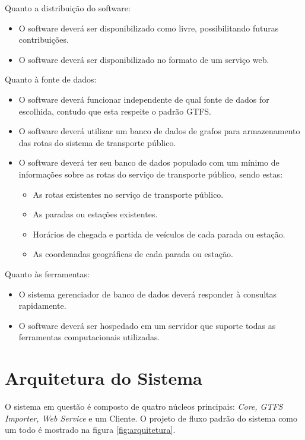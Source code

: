 Quanto a distribuição do software:
\begin{itemize}
	\item O software deverá ser disponibilizado como livre, possibilitando futuras contribuições.
	\item O software deverá ser disponibilizado no formato de um serviço web.
\end{itemize}

Quanto à fonte de dados:
\begin{itemize}
	\item O software deverá funcionar independente de qual fonte de dados for escolhida, contudo que esta respeite o padrão GTFS.
	\item O software deverá utilizar um banco de dados de grafos para armazenamento das rotas do sistema de transporte público.
	\item O software deverá ter seu banco de dados populado com um mínimo de informações sobre as rotas do serviço de transporte público, sendo estas:
	\begin{itemize}
		\item As rotas existentes no serviço de transporte público.
		\item As paradas ou estações existentes.
		\item Horários de chegada e partida de veículos de cada parada ou estação.
		\item As coordenadas geográficas de cada parada ou estação.
	\end{itemize}
\end{itemize}

Quanto às ferramentas:
\begin{itemize}
	\item O sistema gerenciador de banco de dados deverá responder à consultas rapidamente.
	\item O software deverá ser hospedado em um servidor que suporte todas as ferramentas computacionais utilizadas.
\end{itemize}


\section{Arquitetura do Sistema}
O sistema em questão é composto de quatro núcleos principais: \emph{Core, GTFS Importer, Web Service} e um Cliente. 
O projeto de fluxo padrão do sistema como um todo é mostrado na figura \ref{fig:arquitetura}.

